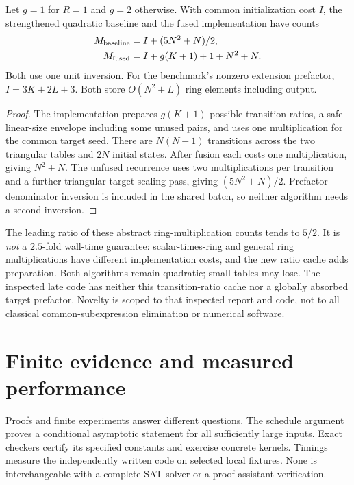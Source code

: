 \documentclass[11pt,letterpaper]{article}
\theoremstyle{remark}\newtheorem{remark}[theorem]{Remark}
\begin{document}
\begin{proposition}\label{prop:fused}
Let $g=1$ for $R=1$ and $g=2$ otherwise. With common initialization cost $I$,
the strengthened quadratic baseline and the fused implementation have counts
\begin{align*}
 M_{\rm baseline}&=I+(5N^2+N)/2,\\
 M_{\rm fused}&=I+g(K+1)+1+N^2+N.
\end{align*}
Both use one unit inversion. For the benchmark's nonzero extension prefactor,
$I=3K+2L+3$. Both store $O(N^2+L)$ ring elements including output.
\end{proposition}
\begin{proof}
The implementation prepares $g(K+1)$ possible transition ratios, a safe
linear-size envelope including some unused pairs, and uses one multiplication
for the common target seed. There are $N(N-1)$ transitions across the two
triangular tables and $2N$ initial states. After fusion each costs one
multiplication, giving $N^2+N$. The unfused recurrence uses two multiplications
per transition and a further triangular target-scaling pass, giving
$(5N^2+N)/2$. Prefactor-denominator inversion is included in the shared batch,
so neither algorithm needs a second inversion.
\end{proof}
The leading ratio of these abstract ring-multiplication counts tends to $5/2$.
It is \emph{not} a $2.5$-fold wall-time guarantee: scalar-times-ring and general
ring multiplications have different implementation costs, and the new ratio
cache adds preparation. Both algorithms remain quadratic; small tables may lose.
The inspected late code has neither this transition-ratio cache nor a globally
absorbed target prefactor. Novelty is scoped to that inspected report and code,
not to all classical common-subexpression elimination or numerical software.

\section{Finite evidence and measured performance}
\label{sec:evidence}
Proofs and finite experiments answer different questions. The schedule argument proves a conditional asymptotic statement for all sufficiently large inputs. Exact checkers certify its specified constants and exercise concrete kernels. Timings measure the independently written code on selected local fixtures. None is interchangeable with a complete SAT solver or a proof-assistant verification.
\end{document}
